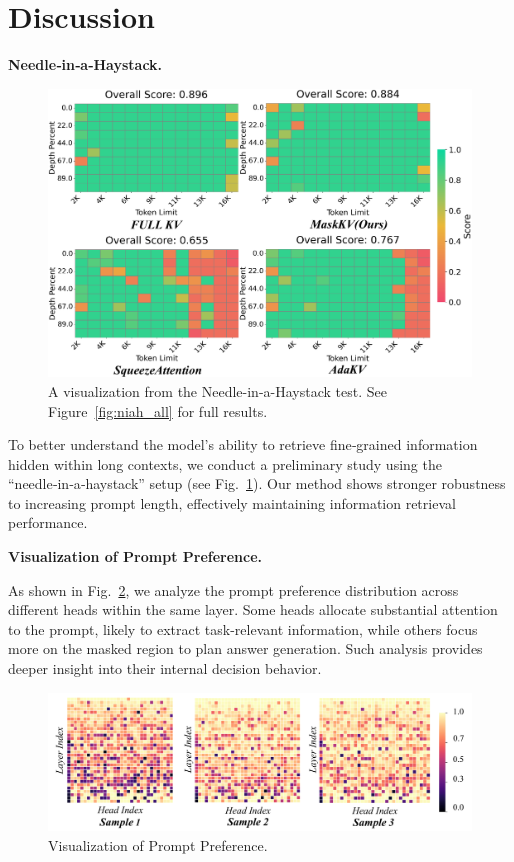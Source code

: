 \section{Discussion}
\noindent \textbf{Needle‑in‑a‑Haystack.}
\begin{figure}[t]
  \centering
  \includegraphics[width=\columnwidth]{figure/NIAH_LLADA.pdf}
    \caption{A visualization from the Needle-in-a-Haystack test. See Figure~\ref{fig:niah_all} for full results.}
  \label{fig:needle}
\end{figure}
To better understand the model’s ability to retrieve fine‑grained information hidden within long contexts, we conduct a preliminary study using the “needle‑in‑a‑haystack” setup (see Fig.~\ref{fig:needle}). Our method shows stronger robustness to increasing prompt length, effectively maintaining information retrieval performance.

\noindent \textbf{Visualization of Prompt Preference.}

As shown in Fig.~\ref{fig:prefer}, we analyze the prompt preference distribution across different heads within the same layer. Some heads allocate substantial attention to the prompt, likely to extract task-relevant information, while others focus more on the masked region to plan answer generation. Such analysis provides deeper insight into their internal decision behavior.

\begin{figure}[H]
  \centering
  \includegraphics[width=\columnwidth]{figure/prefer.pdf}
  \caption{Visualization of Prompt Preference.}
  \label{fig:prefer}
\end{figure}

